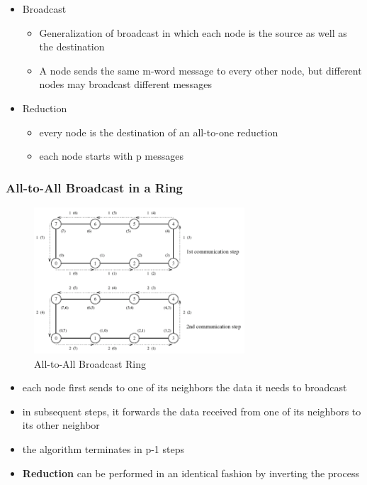 \begin{itemize}
\tightlist
\item
  Broadcast

  \begin{itemize}
  \tightlist
  \item
    Generalization of broadcast in which each node is the source as well
    as the destination
  \item
    A node sends the same m-word message to every other node, but
    different nodes may broadcast different messages
  \end{itemize}
\item
  Reduction

  \begin{itemize}
  \tightlist
  \item
    every node is the destination of an all-to-one reduction
  \item
    each node starts with p messages
  \end{itemize}
\end{itemize}

\hypertarget{all-to-all-broadcast-in-a-ring}{%
\subsubsection{All-to-All Broadcast in a
Ring}\label{all-to-all-broadcast-in-a-ring}}

\begin{figure}[H]
\centering
\includegraphics[width=0.7\textwidth]{figures/all-to-all-broadcast.png}
\caption{All-to-All Broadcast Ring}
\end{figure}

\begin{itemize}
\tightlist
\item
  each node first sends to one of its neighbors the data it needs to
  broadcast
\item
  in subsequent steps, it forwards the data received from one of its
  neighbors to its other neighbor
\item
  the algorithm terminates in p-1 steps
\item
  \textbf{Reduction} can be performed in an identical fashion by
  inverting the process
\end{itemize}

